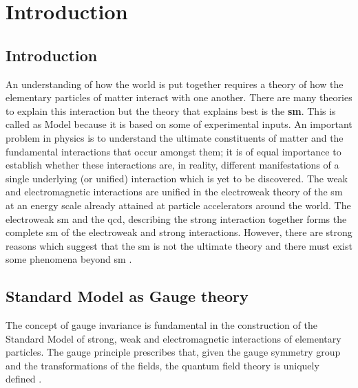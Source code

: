 \chapter{Introduction}\label{ch:second}

\section{Introduction}
An understanding of how the world is put together requires a theory of how the elementary particles of matter interact with one another\cite{paper:ScientificAmericantHooft}. There are many theories to explain this interaction but the theory that explains best is the {\bf {sm}}. This is called as Model because it is based on some of experimental inputs. An important problem in physics is to understand the ultimate constituents of matter and the fundamental interactions that occur amongst them; it is of equal importance to establish whether these interactions are, in reality, different manifestations of a single underlying (or unified) interaction which is yet to be discovered. The weak and electromagnetic interactions are unified in the electroweak theory of the {sm} at an energy scale already attained at particle accelerators around the world. The electroweak {sm} and the  {qcd}, describing the strong interaction together forms the complete {sm} of the electroweak and strong interactions. However, there are strong reasons which suggest that the {sm} is not the ultimate theory and there must exist some phenomena beyond {sm} \cite{paper:ScientificAmericanChrisQuiggEPF, article:PAdventure}.  

\section{Standard Model as Gauge theory}
The concept of gauge invariance is fundamental in the construction of the Standard Model of strong, weak and electromagnetic interactions of elementary particles. The gauge principle prescribes that, given the gauge symmetry group and the transformations of the fields, the quantum field theory is uniquely defined \cite{book:CoughlanDodd}.

